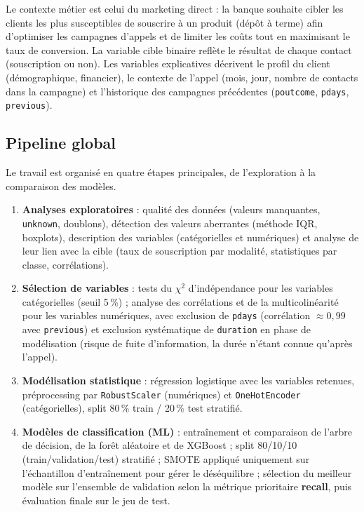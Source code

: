 \documentclass[11pt,a4paper]{article}
\begin{document}
Le contexte métier est celui du marketing direct : la banque souhaite cibler les clients les plus susceptibles de souscrire à un produit (dépôt à terme) afin d'optimiser les campagnes d'appels et de limiter les coûts tout en maximisant le taux de conversion. La variable cible binaire reflète le résultat de chaque contact (souscription ou non). Les variables explicatives décrivent le profil du client (démographique, financier), le contexte de l'appel (mois, jour, nombre de contacts dans la campagne) et l'historique des campagnes précédentes (\texttt{poutcome}, \texttt{pdays}, \texttt{previous}).

\subsection{Pipeline global}
Le travail est organisé en quatre étapes principales, de l'exploration à la comparaison des modèles.
\begin{enumerate}
  \item \textbf{Analyses exploratoires} : qualité des données (valeurs manquantes, \texttt{unknown}, doublons), détection des valeurs aberrantes (méthode IQR, boxplots), description des variables (catégorielles et numériques) et analyse de leur lien avec la cible (taux de souscription par modalité, statistiques par classe, corrélations).
  \item \textbf{Sélection de variables} : tests du $\chi^2$ d'indépendance pour les variables catégorielles (seuil 5\,\%) ; analyse des corrélations et de la multicolinéarité pour les variables numériques, avec exclusion de \texttt{pdays} (corrélation $\approx 0{,}99$ avec \texttt{previous}) et exclusion systématique de \texttt{duration} en phase de modélisation (risque de fuite d'information, la durée n'étant connue qu'après l'appel).
  \item \textbf{Modélisation statistique} : régression logistique avec les variables retenues, préprocessing par \texttt{RobustScaler} (numériques) et \texttt{OneHotEncoder} (catégorielles), split 80\,\% train / 20\,\% test stratifié. 
  \item \textbf{Modèles de classification (ML)} : entraînement et comparaison de l'arbre de décision, de la forêt aléatoire et de XGBoost ; split 80/10/10 (train/validation/test) stratifié ; SMOTE appliqué uniquement sur l'échantillon d'entraînement pour gérer le déséquilibre ; sélection du meilleur modèle sur l'ensemble de validation selon la métrique prioritaire \textbf{recall}, puis évaluation finale sur le jeu de test.
\end{enumerate}
\end{document}

